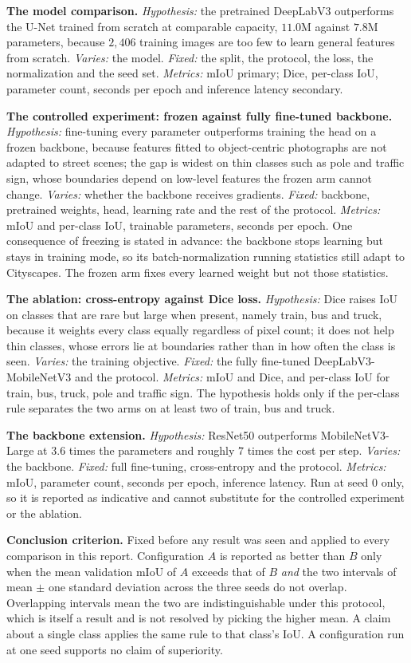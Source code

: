 \textbf{The model comparison.} \emph{Hypothesis:} the pretrained DeepLabV3 outperforms the U-Net
trained from scratch at comparable capacity, $11.0$M against $7.8$M parameters, because
$2{,}406$ training images are too few to learn general features from scratch. \emph{Varies:} the
model. \emph{Fixed:} the split, the protocol, the loss, the normalization and the seed set.
\emph{Metrics:} mIoU primary; Dice, per-class IoU, parameter count, seconds per epoch and
inference latency secondary.

\textbf{The controlled experiment: frozen against fully fine-tuned backbone.}
\emph{Hypothesis:} fine-tuning every parameter outperforms training the head on a frozen
backbone, because features fitted to object-centric photographs are not adapted to street scenes;
the gap is widest on thin classes such as pole and traffic sign, whose boundaries depend on
low-level features the frozen arm cannot change. \emph{Varies:} whether the backbone receives
gradients. \emph{Fixed:} backbone, pretrained weights, head, learning rate and the rest of the
protocol. \emph{Metrics:} mIoU and per-class IoU, trainable parameters, seconds per epoch. One
consequence of freezing is stated in advance: the backbone stops learning but stays in training
mode, so its batch-normalization running statistics still adapt to Cityscapes. The frozen arm
fixes every learned weight but not those statistics.

\textbf{The ablation: cross-entropy against Dice loss.} \emph{Hypothesis:} Dice raises IoU on
classes that are rare but large when present, namely train, bus and truck, because it weights
every class equally regardless of pixel count; it does not help thin classes, whose errors lie at
boundaries rather than in how often the class is seen. \emph{Varies:} the training objective.
\emph{Fixed:} the fully fine-tuned DeepLabV3-MobileNetV3 and the protocol. \emph{Metrics:} mIoU
and Dice, and per-class IoU for train, bus, truck, pole and traffic sign. The hypothesis holds
only if the per-class rule separates the two arms on at least two of train, bus and truck.

\textbf{The backbone extension.} \emph{Hypothesis:} ResNet50 outperforms MobileNetV3-Large at
$3.6$ times the parameters and roughly $7$ times the cost per step. \emph{Varies:} the backbone.
\emph{Fixed:} full fine-tuning, cross-entropy and the protocol. \emph{Metrics:} mIoU, parameter
count, seconds per epoch, inference latency. Run at seed $0$ only, so it is reported as
indicative and cannot substitute for the controlled experiment or the ablation.

\textbf{Conclusion criterion.} Fixed before any result was seen and applied to every comparison
in this report. Configuration $A$ is reported as better than $B$ only when the mean validation
mIoU of $A$ exceeds that of $B$ \emph{and} the two intervals of mean $\pm$ one standard deviation
across the three seeds do not overlap. Overlapping intervals mean the two are indistinguishable
under this protocol, which is itself a result and is not resolved by picking the higher mean. A
claim about a single class applies the same rule to that class's IoU. A configuration run at one
seed supports no claim of superiority.
